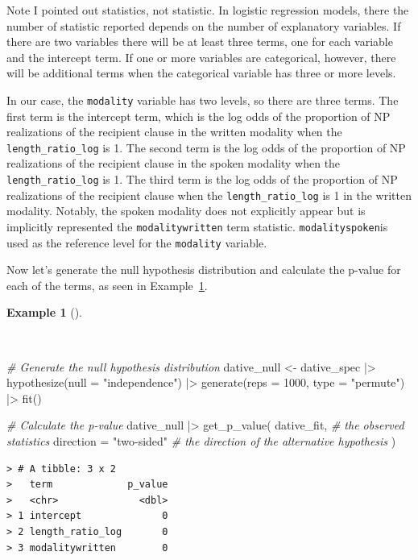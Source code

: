 \documentclass[
  letterpaper,
]{latex/krantz}
\newenvironment{Shaded}{\begin{snugshade}}{\end{snugshade}}
\newcommand{\AttributeTok}[1]{\textcolor[rgb]{0.00,0.00,0.00}{#1}}
\newcommand{\CommentTok}[1]{\textcolor[rgb]{0.00,0.00,0.00}{\textit{#1}}}
\newcommand{\DecValTok}[1]{\textcolor[rgb]{0.00,0.00,0.00}{#1}}
\newcommand{\FunctionTok}[1]{\textcolor[rgb]{0.00,0.00,0.00}{#1}}
\newcommand{\NormalTok}[1]{\textcolor[rgb]{0.00,0.00,0.00}{#1}}
\newcommand{\OtherTok}[1]{\textcolor[rgb]{0.00,0.00,0.00}{#1}}
\newcommand{\SpecialCharTok}[1]{\textcolor[rgb]{0.00,0.00,0.00}{#1}}
\newcommand{\StringTok}[1]{\textcolor[rgb]{0.00,0.00,0.00}{#1}}
\theoremstyle{definition}
\newtheorem{example}{Example}[chapter]
\theoremstyle{remark}
\begin{document}
Note I pointed out statistics, not statistic. In logistic regression
models, there the number of statistic reported depends on the number of
explanatory variables. If there are two variables there will be at least
three terms, one for each variable and the intercept term. If one or
more variables are categorical, however, there will be additional terms
when the categorical variable has three or more levels.

In our case, the \texttt{modality} variable has two levels, so there are
three terms. The first term is the intercept term, which is the log odds
of the proportion of NP realizations of the recipient clause in the
written modality when the \texttt{length\_ratio\_log} is 1. The second
term is the log odds of the proportion of NP realizations of the
recipient clause in the spoken modality when the
\texttt{length\_ratio\_log} is 1. The third term is the log odds of the
proportion of NP realizations of the recipient clause when the
\texttt{length\_ratio\_log} is 1 in the written modality. Notably, the
spoken modality does not explicitly appear but is implicitly represented
the \texttt{modalitywritten} term statistic. \texttt{modalityspoken}is
used as the reference level for the \texttt{modality} variable.

Now let's generate the null hypothesis distribution and calculate the
p-value for each of the terms, as seen in
Example~\ref{exm-ida-cat-null-hypothesis-logistic-regression}.

\begin{example}[]\protect\hypertarget{exm-ida-cat-null-hypothesis-logistic-regression}{}\label{exm-ida-cat-null-hypothesis-logistic-regression}

~

\begin{Shaded}
\begin{Highlighting}[]
\CommentTok{\# Generate the null hypothesis distribution}
\NormalTok{dative\_null }\OtherTok{\textless{}{-}}
\NormalTok{  dative\_spec }\SpecialCharTok{|\textgreater{}}
  \FunctionTok{hypothesize}\NormalTok{(}\AttributeTok{null =} \StringTok{"independence"}\NormalTok{) }\SpecialCharTok{|\textgreater{}}
  \FunctionTok{generate}\NormalTok{(}\AttributeTok{reps =} \DecValTok{1000}\NormalTok{, }\AttributeTok{type =} \StringTok{"permute"}\NormalTok{) }\SpecialCharTok{|\textgreater{}}
  \FunctionTok{fit}\NormalTok{()}

\CommentTok{\# Calculate the p{-}value}
\NormalTok{dative\_null }\SpecialCharTok{|\textgreater{}}
  \FunctionTok{get\_p\_value}\NormalTok{(}
\NormalTok{    dative\_fit, }\CommentTok{\# the observed statistics}
    \AttributeTok{direction =} \StringTok{"two{-}sided"} \CommentTok{\# the direction of the alternative hypothesis}
\NormalTok{  )}
\end{Highlighting}
\end{Shaded}

\begin{verbatim}
> # A tibble: 3 x 2
>   term             p_value
>   <chr>              <dbl>
> 1 intercept              0
> 2 length_ratio_log       0
> 3 modalitywritten        0
\end{verbatim}

\end{example}
\end{document}
